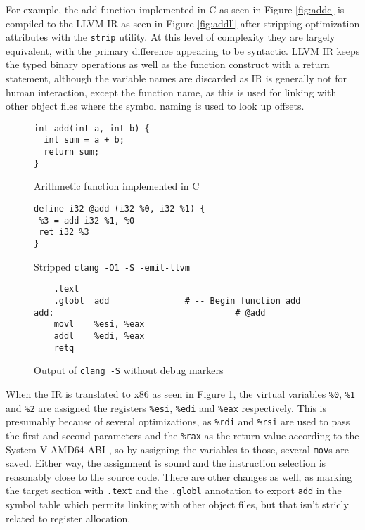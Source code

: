 \documentclass{article}
\begin{document}
For example, the add function implemented in C as seen in Figure \ref{fig:addc} is compiled to the LLVM IR as seen in Figure \ref{fig:addll} after stripping optimization attributes with the \texttt{strip} utility. At this level of complexity they are largely equivalent, with the primary difference appearing to be syntactic. LLVM IR keeps the typed binary operations as well as the function construct with a return statement, although the variable names are discarded as IR is generally not for human interaction, except the function name, as this is used for linking with other object files where the symbol naming is used to look up offsets.

\begin{figure}[H]
   \begin{minipage}{0.48\textwidth}
     \centering
     \begin{verbatim}
int add(int a, int b) {
  int sum = a + b;
  return sum;
}
     \end{verbatim}
     \caption{Arithmetic function implemented in C}\label{fig:addc}
   \end{minipage}\hfill
   \begin{minipage}{0.48\textwidth}
     \centering
     \begin{verbatim}
define i32 @add (i32 %0, i32 %1) {
 %3 = add i32 %1, %0
 ret i32 %3
}
     \end{verbatim}
     \caption{Stripped \texttt{clang -O1 -S -emit-llvm}}\label{fig:addll}
   \end{minipage}
   \begin{center}
   \begin{minipage}{0.83\textwidth}
     \centering
     \begin{verbatim}
	.text
	.globl	add               # -- Begin function add
add:                                    # @add
	movl	%esi, %eax
	addl	%edi, %eax
	retq
     \end{verbatim}
     \caption{Output of \texttt{clang -S} without debug markers}\label{fig:addx86}
   \end{minipage}
   \end{center}
\end{figure}
\noindent When the IR is translated to x86 as seen in Figure \ref{fig:addx86}, the virtual variables \texttt{\%0}, \texttt{\%1} and \texttt{\%2} are assigned the registers \texttt{\%esi}, \texttt{\%edi} and \texttt{\%eax} respectively. This is presumably because of several optimizations, as \texttt{\%rdi} and \texttt{\%rsi} are used to pass the first and second parameters and the \texttt{\%rax} as the return value according to the System V AMD64 ABI \cite{sysv}, so by assigning the variables to those, several \texttt{mov}s are saved. Either way, the assignment is sound and the instruction selection is reasonably close to the  source code. There are other changes as well, as marking the target section with \texttt{.text} and the \texttt{.globl} annotation to export \texttt{add} in the symbol table which permits linking with other object files, but that isn't stricly related to register allocation.
\end{document}
